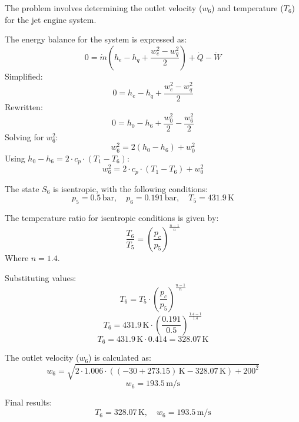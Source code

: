 The problem involves determining the outlet velocity (\( w_6 \)) and temperature (\( T_6 \)) for the jet engine system.  

The energy balance for the system is expressed as:  
\[
0 = \dot{m} \left( h_e - h_q + \frac{w_e^2 - w_q^2}{2} \right) + \dot{Q} - \dot{W}
\]  
Simplified:  
\[
0 = h_e - h_q + \frac{w_e^2 - w_q^2}{2}
\]  
Rewritten:  
\[
0 = h_0 - h_6 + \frac{w_0^2}{2} - \frac{w_6^2}{2}
\]  
Solving for \( w_6^2 \):  
\[
w_6^2 = 2 \left( h_0 - h_6 \right) + w_0^2
\]  
Using \( h_0 - h_6 = 2 \cdot c_p \cdot (T_1 - T_6) \):  
\[
w_6^2 = 2 \cdot c_p \cdot (T_1 - T_6) + w_0^2
\]  

The state \( S_6 \) is isentropic, with the following conditions:  
\[
p_5 = 0.5 \, \text{bar}, \quad p_6 = 0.191 \, \text{bar}, \quad T_5 = 431.9 \, \text{K}
\]  

The temperature ratio for isentropic conditions is given by:  
\[
\frac{T_6}{T_5} = \left( \frac{p_c}{p_5} \right)^{\frac{n-1}{n}}
\]  
Where \( n = 1.4 \).  

Substituting values:  
\[
T_6 = T_5 \cdot \left( \frac{p_c}{p_5} \right)^{\frac{n-1}{n}}
\]  
\[
T_6 = 431.9 \, \text{K} \cdot \left( \frac{0.191}{0.5} \right)^{\frac{1.4 - 1}{1.4}}
\]  
\[
T_6 = 431.9 \, \text{K} \cdot 0.414 = 328.07 \, \text{K}
\]  

The outlet velocity (\( w_6 \)) is calculated as:  
\[
w_6 = \sqrt{2 \cdot 1.006 \cdot \left( (-30 + 273.15) \, \text{K} - 328.07 \, \text{K} \right) + 200^2}
\]  
\[
w_6 = 193.5 \, \text{m/s}
\]  

Final results:  
\[
T_6 = 328.07 \, \text{K}, \quad w_6 = 193.5 \, \text{m/s}
\]